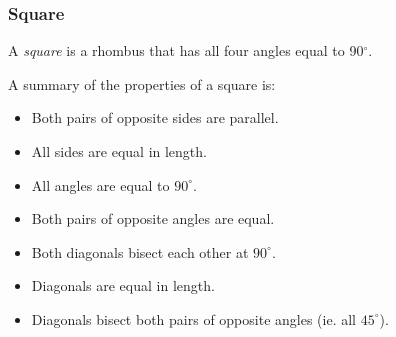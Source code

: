             \subsubsection{ Square}
            \nopagebreak
          \label{m39354*id319154}A \textsl{square} is a rhombus that has all four angles equal to 90\begin{math}{}^{\circ }\end{math}.\par 
          \label{m39354*id319177}A summary of the properties of a square is:\par 
          \label{m39354*id319181}\begin{itemize}[noitemsep]
            \label{m39354*uid77}\item Both pairs of opposite sides are parallel.
\label{m39354*uid78}\item All sides are equal in length.
\label{m39354*uid79}\item All angles are equal to \begin{math}{90}^{\circ }\end{math}.
\label{m39354*uid80}\item Both pairs of opposite angles are equal.
\label{m39354*uid81}\item Both diagonals bisect each other at \begin{math}{90}^{\circ }\end{math}.
\label{m39354*uid82}\item Diagonals are equal in length.
\label{m39354*uid83}\item Diagonals bisect both pairs of opposite angles (ie. all \begin{math}{45}^{\circ }\end{math}).
\end{itemize}
    \setcounter{subfigure}{0}
